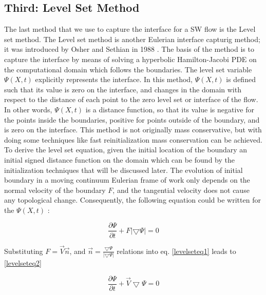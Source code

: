 \documentclass[letterpaper,10pt]{article}
\begin{document}
\subsection{Third: Level Set Method} \label{level set}

The last method that we use to capture the interface for a SW flow is the Level set method.
The Level set method is another Eulerian interface capturig method; it was introduced by Osher and Sethian in 1988 \cite{Osher1988}.
The basis of the method is to capture the interface by means of solving a hyperbolic Hamilton-Jacobi PDE on 
the computational domain which follows the boundaries. The level set variable $\varPsi (X,t)$ explicitly 
represents the interface. In this method, $\varPsi (X,t)$ is defined such that its value is zero on the interface, and 
changes in the domain with respect to the distance of each point to the zero level set or interface of the flow. 
In other words, $\varPsi (X,t)$  is a distance function, so that its value is negative for the points inside the boundaries, 
positive for points outside of the boundary, and is zero on the interface. 
This method is not originally mass conservative, but with doing some 
techniques like fast reinitialization mass conservation can be achieved. 
To derive the level set equation, given the initial location of the boundary an initial signed distance function on 
the domain which can be found by the initialization techniques that will be discussed later. The evolution of initial 
boundary in a moving continuum Eulerian frame of work only depends on the normal velocity of the boundary $F$, 
and the tangential velocity does not cause any topological change. Consequently, the following equation could 
be written for the $\varPsi (X,t)$ :

\begin{equation}\label{levelseteq1}
	\frac{\partial \varPsi}{\partial t} + F |\bigtriangledown \varPsi| = 0
\end{equation}

Substituting $F = \overrightarrow{V} \overrightarrow{n} $, and 
$\overrightarrow{n} = \frac{\bigtriangledown \varPsi}{|\bigtriangledown \varPsi|}$
relations into eq. \eqref{levelseteq1} leads to \eqref{levelseteq2}

\begin{equation}\label{levelseteq2}
	\frac{\partial \varPsi}{\partial t} + \overrightarrow{V} \bigtriangledown \varPsi = 0
\end{equation}
\end{document}
